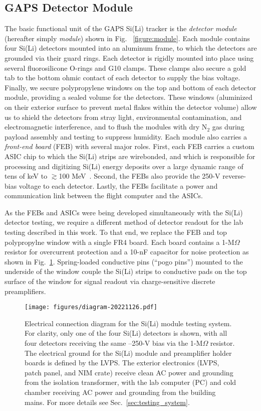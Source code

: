 \documentclass[journal]{IEEEtran}
\begin{document}
\subsection{GAPS Detector Module}
The basic functional unit of the GAPS Si(Li) tracker is the \textit{detector module} (hereafter simply \textit{module}) shown in Fig.~
\ref{figure:module}. Each module contains four Si(Li) detectors mounted into an aluminum frame, to which the detectors are grounded via their guard rings. Each detector is rigidly mounted into place using several fluorosilicone O-rings and G10 clamps. These clamps also secure a gold tab to the bottom ohmic contact of each detector to supply the bias voltage. Finally, we secure polypropylene windows on the top and bottom of each detector module, providing a sealed volume for the detectors. These windows (aluminized on their exterior surface to prevent metal flakes within the detector volume) allow us to shield the detectors from stray light, environmental contamination, and electromagnetic interference, and to flush the modules with dry N$_2$ gas during payload assembly and testing to suppress humidity. Each module also carries a \textit{front-end board} (FEB) with several major roles. First, each FEB carries a custom ASIC chip to which the Si(Li) strips are wirebonded, and which is responsible for processing and digitizing Si(Li) energy deposits over a large dynamic range of tens of keV to ${\gtrsim}$100 MeV~\cite{7286866,Scotti:2019lea,Manghisoni:2021,RE2023167617}. Second, the FEBs also provide the 250-V reverse-bias voltage to each detector. Lastly, the FEBs facilitate a power and communication link between the flight computer and the ASICs.
%
\par As the FEBs and ASICs were being developed simultaneously with the Si(Li) detector testing, we require a different method of detector readout for the lab testing described in this work. To that end, we replace the FEB and top polypropylne window with a single FR4 board. Each board contains a 1-M$\Omega$ resistor for overcurrent protection and a 10-nF capacitor for noise protection as shown in Fig.~\ref{fig:electronic_diagram}. Spring-loaded conductive pins (``pogo pins'') mounted to the underside of the window couple the Si(Li) strips to conductive pads on the top surface of the window for signal readout via charge-sensitive discrete preamplifiers.



\begin{figure}[t]
    \texttt{[image: figures/diagram-20221126.pdf]}
    \caption{Electrical connection diagram for the Si(Li) module testing system. For clarity, only one of the four Si(Li) detectors is shown, with all four detectors receiving the same --250-V bias via the 1-M$\Omega$ resistor. The electrical ground for the Si(Li) module and preamplifier holder boards is defined by the LVPS. The exterior electronics (LVPS, patch panel, and NIM crate) receive clean AC power and grounding from the isolation transformer, with the lab computer (PC) and cold chamber receiving AC power and grounding from the building mains. For more details see Sec.~\ref{sec:testing_system}.}
    \label{fig:electronic_diagram}
\end{figure}
\end{document}
